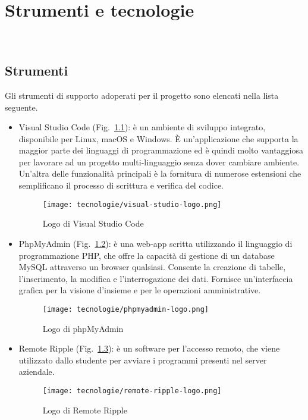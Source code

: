 \chapter{Strumenti e tecnologie}
\label{cap:strumenti-tecnologie}

\\

\section{Strumenti}
\label{sec:strumenti}
Gli strumenti di supporto adoperati per il progetto sono elencati nella lista seguente.

\begin{itemize}
    \item Visual Studio Code (Fig.~\ref{fig:logo-vscode}): è un ambiente di sviluppo integrato, disponibile per Linux, macOS e Windows. 
    È un'applicazione che supporta la maggior parte dei linguaggi di programmazione ed è quindi molto vantaggiosa per lavorare ad un progetto multi-linguaggio senza dover cambiare ambiente.
    Un'altra delle funzionalità principali è la fornitura di numerose estensioni che semplificano il processo di scrittura e verifica del codice.

    \begin{figure}[!h] 
        \centering 
        \texttt{[image: tecnologie/visual-studio-logo.png]} 
        \caption{Logo di Visual Studio Code}
        \label{fig:logo-vscode}
      \end{figure}

\newpage

    \item PhpMyAdmin (Fig.~\ref{fig:logo-phpmyadmin}): è una web-app scritta utilizzando il linguaggio di programmazione PHP, che offre la capacità di gestione di un database MySQL attraverso un browser qualsiasi. Consente la creazione di tabelle, l'inserimento, la modifica e l'interrogazione dei dati.
    Fornisce un'interfaccia grafica per la visione d'insieme e per le operazioni amministrative.

    \begin{figure}[!h] 
        \centering 
        \texttt{[image: tecnologie/phpmyadmin-logo.png]} 
        \caption{Logo di phpMyAdmin}
        \label{fig:logo-phpmyadmin}
      \end{figure}

    
    \item Remote Ripple (Fig.~\ref{fig:logo-remoteripple}): è un software per l'accesso remoto, che viene utilizzato dallo studente per avviare i programmi presenti nel server aziendale.
    
    \begin{figure}[!h] 
        \centering 
        \texttt{[image: tecnologie/remote-ripple-logo.png]} 
        \caption{Logo di Remote Ripple}
        \label{fig:logo-remoteripple}
      \end{figure}

\end{itemize}

